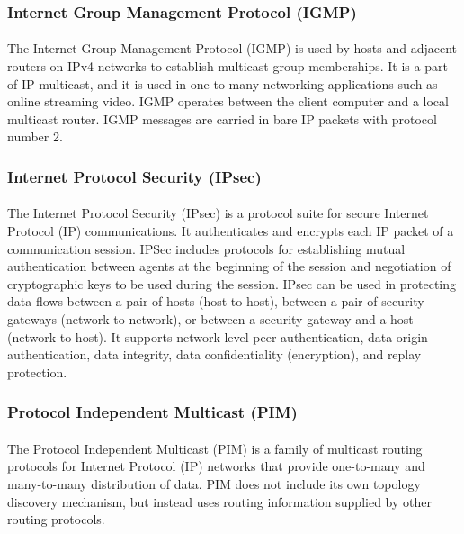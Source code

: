 \subsubsection*{Internet Group Management Protocol (IGMP)\cite{IGMP}}
\paragraph{}The Internet Group Management Protocol (IGMP) is used by hosts and adjacent routers on IPv4 networks to establish multicast group memberships. It is a part of IP multicast, and it is used in one-to-many networking applications such as online streaming video. IGMP operates between the client computer and a local multicast router. IGMP messages are carried in bare IP packets with protocol number 2.

\subsubsection*{Internet Protocol Security (IPsec)\cite{IPsec}}
\paragraph{}The Internet Protocol Security (IPsec) is a protocol suite for secure Internet Protocol (IP) communications. It authenticates and encrypts each IP packet of a communication session. IPSec includes protocols for establishing mutual authentication between agents at the beginning of the session and negotiation of cryptographic keys to be used during the session. IPsec can be used in protecting data flows between a pair of hosts (host-to-host), between a pair of security gateways (network-to-network), or between a security gateway and a host (network-to-host). It supports network-level peer authentication, data origin authentication, data integrity, data confidentiality (encryption), and replay protection.
\subsubsection*{Protocol Independent Multicast (PIM)\cite{PIMSM}\cite{PIMDM}}
\paragraph{}The Protocol Independent Multicast (PIM) is a family of multicast routing protocols for Internet Protocol (IP) networks that provide one-to-many and many-to-many distribution of data. PIM does not include its own topology discovery mechanism, but instead uses routing information supplied by other routing protocols.
